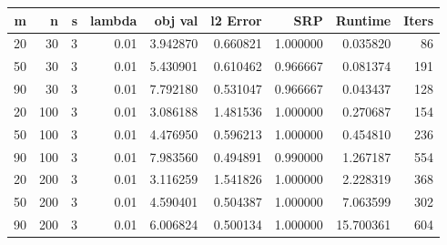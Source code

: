 \begin{tabular}{rrrrrrrrr}
\toprule
 m &   n &  s &  lambda &  obj val &  l2 Error &      SRP &   Runtime &  Iters \\
\midrule
20 &  30 &  3 &    0.01 & 3.942870 &  0.660821 & 1.000000 &  0.035820 &     86 \\
50 &  30 &  3 &    0.01 & 5.430901 &  0.610462 & 0.966667 &  0.081374 &    191 \\
90 &  30 &  3 &    0.01 & 7.792180 &  0.531047 & 0.966667 &  0.043437 &    128 \\
20 & 100 &  3 &    0.01 & 3.086188 &  1.481536 & 1.000000 &  0.270687 &    154 \\
50 & 100 &  3 &    0.01 & 4.476950 &  0.596213 & 1.000000 &  0.454810 &    236 \\
90 & 100 &  3 &    0.01 & 7.983560 &  0.494891 & 0.990000 &  1.267187 &    554 \\
20 & 200 &  3 &    0.01 & 3.116259 &  1.541826 & 1.000000 &  2.228319 &    368 \\
50 & 200 &  3 &    0.01 & 4.590401 &  0.504387 & 1.000000 &  7.063599 &    302 \\
90 & 200 &  3 &    0.01 & 6.006824 &  0.500134 & 1.000000 & 15.700361 &    604 \\
\bottomrule
\end{tabular}
